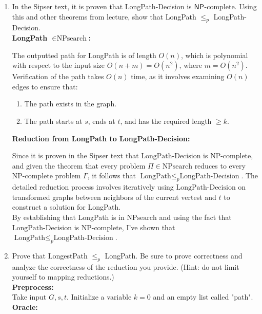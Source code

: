 \documentclass[11pt]{article}
\begin{document}
\begin{enumerate}
\begin{enumerate}
\item In the Sipser text, it is proven that LongPath-Decision is $\mathsf{NP}$-complete.  Using this and other theorems from lecture, show that LongPath $\leq_p$ LongPath-Decision. \\

\textbf{LongPath $\in \text{NPsearch}$:}

The outputted path for LongPath is of length $O(n)$, which is polynomial with respect to the input size $O(n + m) = O(n^2)$, where $m = O(n^2)$. Verification of the path takes $O(n)$ time, as it involves examining $O(n)$ edges to ensure that:
\begin{enumerate}
    \item The path exists in the graph.
    \item The path starts at $s$, ends at $t$, and has the required length $\geq k$. \\
\end{enumerate}

\textbf{Reduction from LongPath to LongPath-Decision:}

Since it is proven in the Sipser text that $\text{LongPath-Decision}$ is NP-complete, and given the theorem that every problem $\Pi \in \text{NPsearch}$ reduces to every NP-complete problem $\Gamma$, it follows that $\text{LongPath} \leq_p \text{LongPath-Decision}$. The detailed reduction process involves iteratively using $\text{LongPath-Decision}$ on transformed graphs between neighbors of the current vertest and $t$ to construct a solution for LongPath. \\

By establishing that LongPath is in $\text{NPsearch}$ and using the fact that $\text{LongPath-Decision}$ is NP-complete, I've shown that $\text{LongPath} \leq_p \text{LongPath-Decision}$. \\


\item Prove that LongestPath $\leq_p$ LongPath.  Be sure to prove correctness and analyze the correctness of the reduction you provide.  (Hint: do not limit yourself to mapping reductions.) \\

\textbf{Preprocess:} \\

Take input $G, s, t$. Initialize a variable $k=0$ and an empty list called "path". \\

\textbf{Oracle:} \\


\end{enumerate}
\end{enumerate}
\end{document}
